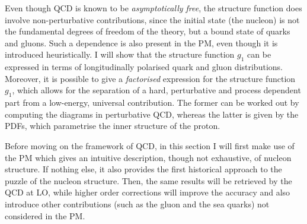 Even though QCD is known to be \textit{asymptotically free}, the structure function does involve non-perturbative contributions, since the initial state (the nucleon) is not the fundamental degrees of freedom of the theory, but a bound state of quarks and gluons. Such a dependence is also present in the PM, even though it is introduced heuristically. I will show that the structure function $g_1$ can be expressed in terms of longitudinally polarised quark and gluon distributions. Moreover, it is possible to give a \textit{factorised} expression for the structure function $g_1$, which allows for the separation of a hard, perturbative and process dependent part from a low-energy, universal contribution. The former can be worked out by computing the diagrams in perturbative QCD, whereas the latter is given by the PDFs, which parametrise the inner structure of the proton.%

Before moving on the framework of QCD, in this section I will first make use of the PM which gives an intuitive description, though not exhaustive, of nucleon structure. If nothing else, it also provides the first historical approach to the puzzle of the nucleon structure. Then, the same results will be retrieved by the QCD at LO, while higher order corrections will improve the accuracy and also introduce other contributions (such as the gluon and the sea quarks) not considered in the PM.


